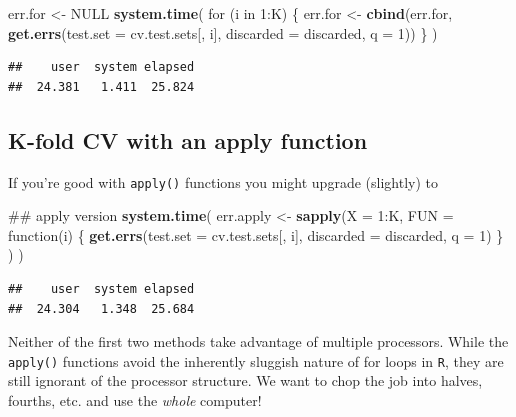 \documentclass[]{article}
\newenvironment{Shaded}{\begin{snugshade}}{\end{snugshade}}
\newcommand{\KeywordTok}[1]{\textcolor[rgb]{0.13,0.29,0.53}{\textbf{{#1}}}}
\newcommand{\DataTypeTok}[1]{\textcolor[rgb]{0.13,0.29,0.53}{{#1}}}
\newcommand{\DecValTok}[1]{\textcolor[rgb]{0.00,0.00,0.81}{{#1}}}
\newcommand{\StringTok}[1]{\textcolor[rgb]{0.31,0.60,0.02}{{#1}}}
\newcommand{\OtherTok}[1]{\textcolor[rgb]{0.56,0.35,0.01}{{#1}}}
\newcommand{\NormalTok}[1]{{#1}}
\begin{document}
\begin{Shaded}
\begin{Highlighting}[]
\NormalTok{err.for <-}\StringTok{ }\OtherTok{NULL}
\KeywordTok{system.time}\NormalTok{(}
    \NormalTok{for (i in }\DecValTok{1}\NormalTok{:K) \{}
        \NormalTok{err.for <-}\StringTok{ }\KeywordTok{cbind}\NormalTok{(err.for, }\KeywordTok{get.errs}\NormalTok{(}\DataTypeTok{test.set =} \NormalTok{cv.test.sets[, i],}
                                           \DataTypeTok{discarded =} \NormalTok{discarded,}
                                           \DataTypeTok{q =} \DecValTok{1}\NormalTok{))}
        \NormalTok{\}}
    \NormalTok{)}
\end{Highlighting}
\end{Shaded}

\begin{verbatim}
##    user  system elapsed 
##  24.381   1.411  25.824
\end{verbatim}

\subsection{K-fold CV with an apply
function}\label{k-fold-cv-with-an-apply-function}

If you're good with \texttt{apply()} functions you might upgrade
(slightly) to

\begin{Shaded}
\begin{Highlighting}[]
\NormalTok{## apply version}
\KeywordTok{system.time}\NormalTok{(}
    \NormalTok{err.apply <-}\StringTok{ }\KeywordTok{sapply}\NormalTok{(}\DataTypeTok{X =} \DecValTok{1}\NormalTok{:K, }
                        \DataTypeTok{FUN =} \NormalTok{function(i) \{}
                            \KeywordTok{get.errs}\NormalTok{(}\DataTypeTok{test.set =} \NormalTok{cv.test.sets[, i],}
                                     \DataTypeTok{discarded =} \NormalTok{discarded,}
                                     \DataTypeTok{q =} \DecValTok{1}\NormalTok{)}
                            \NormalTok{\}}
                        \NormalTok{)}
    \NormalTok{)}
\end{Highlighting}
\end{Shaded}

\begin{verbatim}
##    user  system elapsed 
##  24.304   1.348  25.684
\end{verbatim}

Neither of the first two methods take advantage of multiple processors.
While the \texttt{apply()} functions avoid the inherently sluggish
nature of for loops in \texttt{R}, they are still ignorant of the
processor structure. We want to chop the job into halves, fourths, etc.
and use the \emph{whole} computer!
\end{document}
